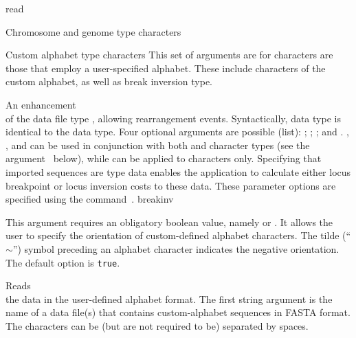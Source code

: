 \begin{command}{read}{}
\begin{arguments}
\begin{argumentgroup}{Chromosome and genome type characters}
   \end{argumentgroup}
   
   
   \begin{argumentgroup}{Custom alphabet type characters}
	This set of arguments are for characters are those that employ a user-specified alphabet. These include
	characters of the custom alphabet, as well as break inversion type.
	
	{An enhancement \\ of the data file type , allowing
            rearrangement events. Syntactically,  data type is identical to the
             data type.  Four optional arguments are possible (\poylident list): 
            ;  ;  ;  and  .
            , , and  can be used in conjunction
            with both  and  character types (see the argument~ below), 
            while  can be applied to  characters only.
            Specifying that imported sequences are  type data enables
            the application to calculate  either locus breakpoint or locus inversion costs to these data.  These parameter
            options are specified using the command~.} 
            {breakinv}
           
            \begin{description}
	{This argument requires an obligatory boolean value, namely  or .
	It allows the user to specify the orientation of custom-defined alphabet
	characters. The tilde (``$\sim$'') symbol preceding 
	an alphabet character indicates the negative orientation. The default option is \texttt{true}. }
	{}
	\end{description}
      
            {Reads \\ the data in the user-defined alphabet format. The first string argument is
            the name of a data file(s) that contains custom-alphabet sequences in FASTA format. 
            The characters can be (but are not required to be) separated by spaces.
                     
}
\end{argumentgroup}
\end{arguments}
\end{command}
